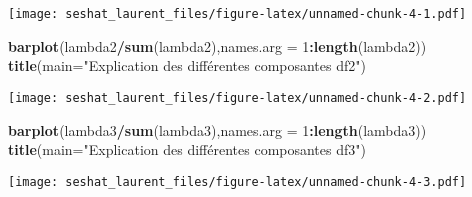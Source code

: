 \documentclass[
]{article}
\newenvironment{Shaded}{\begin{snugshade}}{\end{snugshade}}
\newcommand{\CommentTok}[1]{\textcolor[rgb]{0.56,0.35,0.01}{\textit{#1}}}
\newcommand{\DataTypeTok}[1]{\textcolor[rgb]{0.13,0.29,0.53}{#1}}
\newcommand{\DecValTok}[1]{\textcolor[rgb]{0.00,0.00,0.81}{#1}}
\newcommand{\KeywordTok}[1]{\textcolor[rgb]{0.13,0.29,0.53}{\textbf{#1}}}
\newcommand{\NormalTok}[1]{#1}
\newcommand{\OperatorTok}[1]{\textcolor[rgb]{0.81,0.36,0.00}{\textbf{#1}}}
\newcommand{\StringTok}[1]{\textcolor[rgb]{0.31,0.60,0.02}{#1}}
\begin{document}
\texttt{[image: seshat\_laurent\_files/figure-latex/unnamed-chunk-4-1.pdf]}

\begin{Shaded}
\begin{Highlighting}[]
\KeywordTok{barplot}\NormalTok{(lambda2}\OperatorTok{/}\KeywordTok{sum}\NormalTok{(lambda2),}\DataTypeTok{names.arg =} \DecValTok{1}\OperatorTok{:}\KeywordTok{length}\NormalTok{(lambda2))}
\KeywordTok{title}\NormalTok{(}\DataTypeTok{main=}\StringTok{"Explication des différentes composantes df2"}\NormalTok{)}
\end{Highlighting}
\end{Shaded}

\texttt{[image: seshat\_laurent\_files/figure-latex/unnamed-chunk-4-2.pdf]}

\begin{Shaded}
\begin{Highlighting}[]
\KeywordTok{barplot}\NormalTok{(lambda3}\OperatorTok{/}\KeywordTok{sum}\NormalTok{(lambda3),}\DataTypeTok{names.arg =} \DecValTok{1}\OperatorTok{:}\KeywordTok{length}\NormalTok{(lambda3))}
\KeywordTok{title}\NormalTok{(}\DataTypeTok{main=}\StringTok{"Explication des différentes composantes df3"}\NormalTok{)}
\end{Highlighting}
\end{Shaded}

\texttt{[image: seshat\_laurent\_files/figure-latex/unnamed-chunk-4-3.pdf]}

\begin{Shaded}
\end{Shaded}
\end{document}
